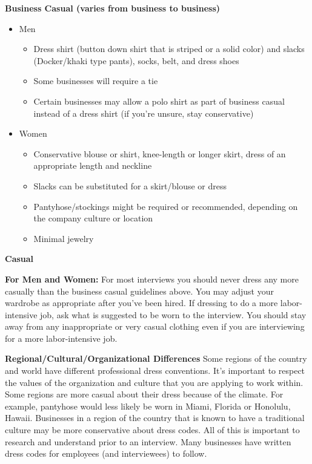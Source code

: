 \textbf{Business Casual (varies from business to business) }
\begin{itemize}[leftmargin=*]
\item Men
\begin{itemize}
\item Dress shirt (button down shirt that is striped or a solid color) and slacks (Docker/khaki type pants), socks, belt, and dress shoes
\item Some businesses will require a tie
\item Certain businesses may allow a polo shirt as part of business casual instead of a dress shirt (if you're unsure, stay conservative)
\end{itemize}
\item Women
\begin{itemize}
\item Conservative blouse or shirt, knee-length or longer skirt, dress of an appropriate length and neckline
\item Slacks can be substituted for a skirt/blouse or dress
\item Pantyhose/stockings might be required or recommended, depending on the company culture or location
\item Minimal jewelry 
\end{itemize}\end{itemize}
\textbf{Casual}

\textbf{For Men and Women:}
\break For most interviews you should never dress any more casually than the business casual guidelines above. You may adjust your wardrobe as appropriate after you've been hired. If dressing to do a more labor-intensive job, ask what is suggested to be worn to the interview. You should stay away from any inappropriate or very casual clothing even if you are interviewing for a more labor-intensive job.

\textbf{Regional/Cultural/Organizational Differences}
\break Some regions of the country and world have different professional dress conventions. It's important to respect the values of the organization and culture that you are applying to work within. Some regions are more casual about their dress because of the climate. For example, pantyhose would less likely be worn in Miami, Florida or Honolulu, Hawaii. Businesses in a region of the country that is known to have a traditional culture may be more conservative about dress codes. All of this is important to research and understand prior to an interview. Many businesses have written dress codes for employees (and interviewees) to follow.

